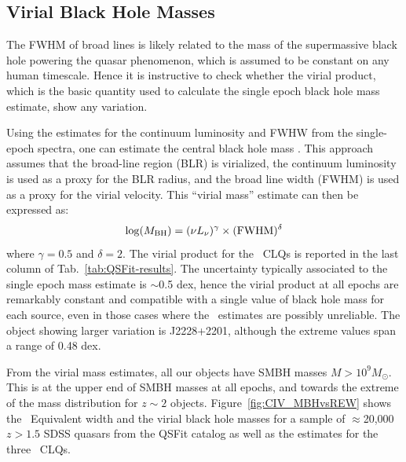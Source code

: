 \documentclass[fleqn,usenatbib]{mnras}
\begin{document}
\subsection{Virial Black Hole Masses}
The FWHM of broad lines is likely related to the mass of the
supermassive black hole powering the quasar phenomenon, which is
assumed to be constant on any human timescale.  Hence it is
instructive to check whether the virial product, which is the basic
quantity used to calculate the single epoch black hole mass estimate,
show any variation.

Using the estimates for the continuum luminosity and FWHW from the
single-epoch spectra, one can estimate the central black hole mass
\citep[e.g.][]{Shen2011, Calderone2017}.  This approach assumes that
the broad-line region (BLR) is virialized, the continuum luminosity is
used as a proxy for the BLR radius, and the broad line width (FWHM) is
used as a proxy for the virial velocity.  This ``virial mass''
estimate can then be expressed as:
\begin{equation}
  \log(M_{\rm BH}) = (\nu L_{\nu})^{\gamma} \times ({\rm FWHM})^{\delta}
\end{equation}
where $\gamma=0.5$ and $\delta=2$.  The virial product for the \civ\
CLQs is reported in the last column of Tab.~\ref{tab:QSFit-results}. 
The uncertainty typically associated to the single epoch mass estimate
is $\sim$0.5 dex, hence the virial product at all epochs are
remarkably constant and compatible with a single value of black hole
mass for each source, even in those cases where the \civ\ estimates
are possibly unreliable. The object showing larger variation is
J2228+2201, although the extreme values span a range of 0.48 dex.

From the virial mass estimates, all our objects have SMBH masses $M >10^{9} M_{\odot}$.
This is at the upper end of SMBH masses at all epochs, and towards the
extreme of the mass distribution for $z\sim2$ objects.  
Figure~\ref{fig:CIV_MBHvsREW} shows the \civ\ Equivalent width and the
virial black hole masses for a sample of $\approx$20,000 $z>1.5$ SDSS
quasars from the QSFit catalog as well as the estimates for the three
\civ\ CLQs.
\end{document}
